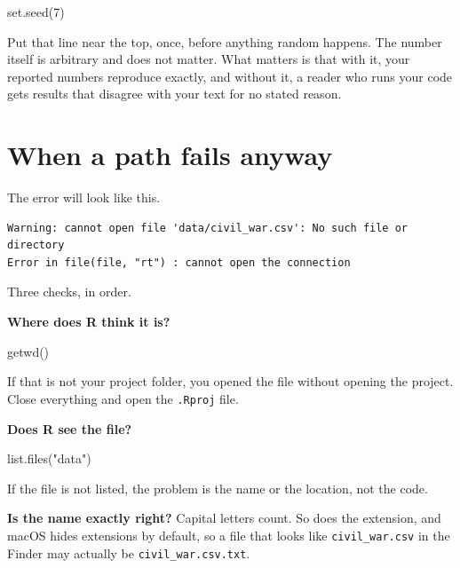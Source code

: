 \documentclass[
  a4paper,
]{scrbook}
\newenvironment{Shaded}{\begin{snugshade}}{\end{snugshade}}
\newcommand{\DecValTok}[1]{\textcolor[rgb]{0.68,0.00,0.00}{#1}}
\newcommand{\FunctionTok}[1]{\textcolor[rgb]{0.28,0.35,0.67}{#1}}
\newcommand{\NormalTok}[1]{\textcolor[rgb]{0.00,0.23,0.31}{#1}}
\newcommand{\StringTok}[1]{\textcolor[rgb]{0.13,0.47,0.30}{#1}}
\begin{document}
\begin{Shaded}
\begin{Highlighting}[]
\FunctionTok{set.seed}\NormalTok{(}\DecValTok{7}\NormalTok{)}
\end{Highlighting}
\end{Shaded}

Put that line near the top, once, before anything random happens. The
number itself is arbitrary and does not matter. What matters is that
with it, your reported numbers reproduce exactly, and without it, a
reader who runs your code gets results that disagree with your text for
no stated reason.

\section*{When a path fails anyway}\label{when-a-path-fails-anyway}


The error will look like this.

\begin{verbatim}
Warning: cannot open file 'data/civil_war.csv': No such file or directory
Error in file(file, "rt") : cannot open the connection
\end{verbatim}

Three checks, in order.

\textbf{Where does R think it is?}

\begin{Shaded}
\begin{Highlighting}[]
\FunctionTok{getwd}\NormalTok{()}
\end{Highlighting}
\end{Shaded}

If that is not your project folder, you opened the file without opening
the project. Close everything and open the \texttt{.Rproj} file.

\textbf{Does R see the file?}

\begin{Shaded}
\begin{Highlighting}[]
\FunctionTok{list.files}\NormalTok{(}\StringTok{"data"}\NormalTok{)}
\end{Highlighting}
\end{Shaded}

If the file is not listed, the problem is the name or the location, not
the code.

\textbf{Is the name exactly right?} Capital letters count. So does the
extension, and macOS hides extensions by default, so a file that looks
like \texttt{civil\_war.csv} in the Finder may actually be
\texttt{civil\_war.csv.txt}.
\end{document}
